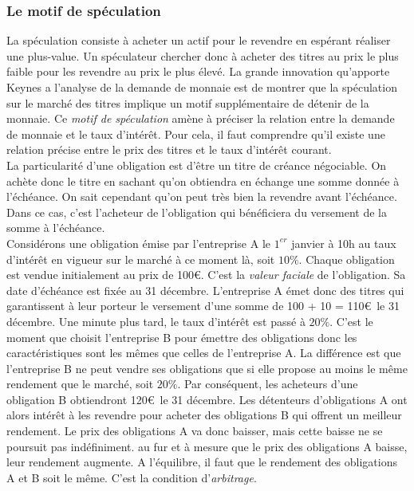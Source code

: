 \documentclass[10pt]{book}
\begin{document}
\subsubsection{Le motif de spéculation}
La spéculation consiste à acheter un actif pour le revendre en espérant réaliser une plus-value. Un spéculateur chercher donc à acheter des titres au prix le plus faible pour les revendre au prix le plus élevé. La grande innovation qu'apporte Keynes a l'analyse de la demande de monnaie est de montrer que la spéculation sur le marché des titres implique un motif supplémentaire de détenir de la monnaie. Ce \textit{motif de spéculation} amène à préciser la relation entre la demande de monnaie et le taux d'intérêt. Pour cela, il faut comprendre qu'il existe une relation précise entre le prix des titres et le taux d'intérêt courant. \\
La particularité d'une obligation est d'être un titre de créance négociable. On achète donc le titre en sachant qu'on obtiendra en échange une somme donnée à l'échéance. On sait cependant qu'on peut très bien la revendre avant l'échéance. Dans ce cas, c'est l'acheteur de l'obligation qui bénéficiera du versement de la somme à l'échéance. \\
Considérons une obligation émise par l'entreprise A le $1^{er}$ janvier à 10h au taux d'intérêt en vigueur sur le marché à ce moment là, soit $10\%$. Chaque obligation est vendue initialement au prix de 100\euro. C'est la \textit{valeur faciale} de l'obligation. Sa date d'échéance est fixée au 31 décembre. L'entreprise A émet donc des titres qui garantissent à leur porteur le versement d'une somme de 100 + 10 = 110\euro~le 31 décembre. Une minute plus tard, le taux d'intérêt est passé à $20\%$. C'est le moment que choisit l'entreprise B pour émettre des obligations donc les caractéristiques sont les mêmes que celles de l'entreprise A. La différence est que l'entreprise B ne peut vendre ses obligations que si elle propose au moins le même rendement que le marché, soit $20\%$. Par conséquent, les acheteurs d'une obligation B obtiendront 120\euro~le 31 décembre. Les détenteurs d'obligations A ont alors intérêt à les revendre pour acheter des obligations B qui offrent un meilleur rendement. Le prix des obligations A va donc baisser, mais cette baisse ne se poursuit pas indéfiniment. au fur et à mesure que le prix des obligations A baisse, leur rendement augmente. A l'équilibre, il faut que le rendement des obligations A et B soit le même. C'est la condition d'\textit{arbitrage}. \\
\end{document}
